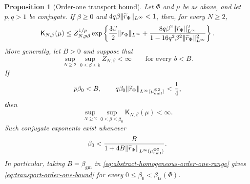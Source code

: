 \documentclass[11pt,reqno]{amsart}
\numberwithin{equation}{section}
\theoremstyle{plain}
\newtheorem{prop}[prop]{Proposition}
\theoremstyle{definition}
\DeclarePairedDelimiter{\norm}{\lVert}{\rVert}
\newcommand{\be}{\beta}
\newcommand{\K}{\mathsf K}
\newcommand{\tl}{\widetilde}
\newcommand{\muunif}{\mu_{\mathrm{unif}}}
\newcommand{\gm}{\mathrm{gm}}
\newcommand{\tr}{\mathrm{tr}}
\begin{document}
\begin{prop}[Order-one transport bound]
\label{prop:order-one-transport}
Let $\Phi$ and $\mu$ be as above, and let $p,q>1$ be conjugate. If $\be\geq0$ and $4q\be\norm{\tl r_{\Phi}}_{L^\infty}<1$, then, for every $N\geq2$,
\begin{equation}
 \K_{N,\be}(\mu)\leq Z_{N,p\be}^{1/p}
 \exp\left\{\frac{3\be}{2}\norm{r_{\Phi}}_{L^\infty}
 +\frac{8q\be^2\norm{\tl r_{\Phi}}_{L^\infty}^2}
 {1-16q^2\be^2\norm{\tl r_{\Phi}}_{L^\infty}^2}\right\}.
 \label{eq:explicit-order-one-transport}
\end{equation}
More generally, let $B>0$ and suppose that
\begin{equation}
 \sup_{N\geq2}\sup_{0\leq\be\leq b} Z_{N,\be}<\infty
 \qquad\text{for every }b<B.
 \label{eq:abstract-homogeneous-order-one-range}
\end{equation}
If
\begin{equation}
 p\be_0<B,
 \qquad
 q\be_0\norm{\tl r_{\Phi}}_{L^\infty(\muunif^{\otimes2})}<\frac14,
 \label{eq:transport-holder-conditions}
\end{equation}
then
\begin{equation}
 \sup_{N\geq2}\sup_{0\leq\be\leq\be_0}
 \K_{N,\be}(\mu)<\infty.
 \label{eq:transport-order-one-bound}
\end{equation}
Such conjugate exponents exist whenever
\begin{equation}
 \be_0<\frac{B}{1+4B\norm{\tl r_{\Phi}}_{L^\infty(\muunif^{\otimes2})}}.
 \label{eq:optimized-transport-range}
\end{equation}
In particular, taking $B=\beta_{\gm}$ in \eqref{eq:abstract-homogeneous-order-one-range} gives \eqref{eq:transport-order-one-bound} for every $0\leq\be_0<\beta_{\tr}(\Phi)$.
\end{prop}
\end{document}
